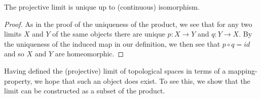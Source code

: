         \begin{claim}
          The projective limit is unique up to (continuous) isomorphism.
          \begin{proof}
            As in the proof of the uniqueness of the product, we see that for any two limits $X$ and $Y$ of the same objects there are unique $p:X\rightarrow Y$ and $q:Y\rightarrow X$.
            By the uniqueness of the induced map in our definition, we then see that $p\circ q=id$ and so $X$ and $Y$ are homeomorphic.
          \end{proof}
        \end{claim}

        Having defined the (projective) limit of topological spaces in terms of a mapping-property, we hope that such an object does exist.
        To see this, we show that the limit can be constructed as a subset of the product.

